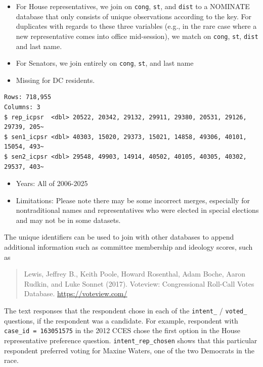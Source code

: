\documentclass[10pt,article,oneside]{memoir}
\begin{document}
\begin{itemize}
\tightlist
\item
  For House representatives, we join on \texttt{cong}, \texttt{st}, and
  \texttt{dist} to a NOMINATE database that only consists of unique
  observations according to the key. For duplicates with regards to
  these three variables (e.g., in the rare case where a new
  representative comes into office mid-session), we match on
  \texttt{cong}, \texttt{st}, \texttt{dist} and last name.
\item
  For Senators, we join entirely on \texttt{cong}, \texttt{st}, and last
  name
\item
  Missing for DC residents.
\end{itemize}

\begin{verbatim}
Rows: 718,955
Columns: 3
$ rep_icpsr  <dbl> 20522, 20342, 29132, 29911, 29380, 20531, 29126, 29739, 205~
$ sen1_icpsr <dbl> 40303, 15020, 29373, 15021, 14858, 49306, 40101, 15054, 493~
$ sen2_icpsr <dbl> 29548, 49903, 14914, 40502, 40105, 40305, 40302, 29537, 403~
\end{verbatim}

\begin{itemize}
\tightlist
\item
  Years: All of 2006-2025
\item
  Limitations: Please note there may be some incorrect merges,
  especially for nontraditional names and representatives who were
  elected in special elections and may not be in some datasets.
\end{itemize}

The unique identifiers can be used to join with other databases to
append additional information such as committee membership and ideology
scores, such as

\begin{quote}
Lewis, Jeffrey B., Keith Poole, Howard Rosenthal, Adam Boche, Aaron
Rudkin, and Luke Sonnet (2017). Voteview: Congressional Roll-Call Votes
Database. \url{https://voteview.com/}
\end{quote}

The text responses that the respondent chose in each of the
\texttt{intent\_} / \texttt{voted\_} questions, if the respondent was a
candidate. For example, respondent with \texttt{case\_id\ =\ 163051575}
in the 2012 CCES chose the first option in the House representative
preference question. \texttt{intent\_rep\_chosen} shows that this
particular respondent preferred voting for Maxine Waters, one of the two
Democrats in the race.
\end{document}
